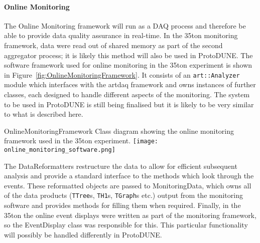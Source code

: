 \paragraph{Online Monitoring}
The Online Monitoring framework will run as a DAQ process and therefore be
able to provide data quality assurance in real-time. In the 35ton monitoring
framework, data were read out of shared memory as part of the second
aggregator process; it is likely this method will also be used in ProtoDUNE.
The software framework used for online monitoring in the 35ton experiment is
shown in Figure~\ref{fig:OnlineMonitoringFramework}.  It consists of an
\texttt{art::Analyzer} module which interfaces with the artdaq framework and
owns instances of further classes, each designed to handle different aspects
of the monitoring.  The system to be used in ProtoDUNE is still being
finalised but it is likely to be very similar to what is described here.

\begin{cdrfigure}{OnlineMonitoringFramework}{
    Class diagram showing the online monitoring framework used in the 35ton
    experiment. }
  \texttt{[image: online\_monitoring\_software.png]}
\end{cdrfigure}

The DataReformatters restructure the data to allow for efficient subsequent
analysis and provide a standard interface to the methods which look through
the events.  These reformatted objects are passed to MonitoringData, which
owns all of the data products (\texttt{TTree}s, \texttt{TH1}s, \texttt{TGraph}s
etc.) output from the monitoring software and provides methods for filling
them when required.  Finally, in the 35ton the online event displays were
written as part of the monitoring framework, so the EventDisplay class was
responsible for this.  This particular functionality will possibly be handled
differently in ProtoDUNE.

